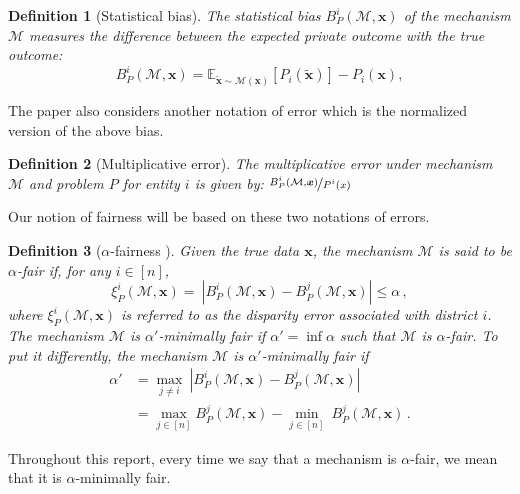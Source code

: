 \documentclass[9pt,lineno,twocolumn,twoside]{pnas-new}
\newtheorem{definition}{Definition}
\newcommand{\cM}{\mathcal{M}}
\newcommand{\EE}{\mathbb{E}} \newcommand{\RR}{\mathbb{R}}
\newcommand{\truedata}{\bm{x}}
\begin{document}
    \begin{definition}[Statistical bias]
        \label{def:bias}
        The statistical bias  $ B_P^i(\cM, \bm{x}) $ of the mechanism $\cM$ measures the difference between the expected private outcome with the true outcome:
        \begin{equation}
            \label{eq:bias}
            B_P^i(\cM, \bm{x}) =
            \EE_{\tilde{\bm{x}} \sim \cM(\bm{x})} \left[ P_i(\tilde{\bm{x}}) \right] - P_i (\bm{x}),
        \end{equation}

    \end{definition}

    The paper also considers another notation of error which is the normalized version of the above bias.
    \begin{definition}[Multiplicative error]
        The multiplicative error under mechanism $\cM$ and problem $P$ for entity $i$ is given by: $\nicefrac{B_P^i(\cM, \bm{x})}{P^i(x)}$

    \end{definition}

    Our notion of fairness will be based on these two notations of errors.


    \begin{definition}[$\alpha$-fairness \cite{fioretto:CP-19,}]
        Given the true data $\truedata$, the mechanism $\cM$ is said to be \emph{$\alpha$-fair} if, for any $i\in[n]$,
        \begin{equation*}
            \xi^{i}_P(\cM, \bm{x}) = ~\left\vert  B_P^i(\cM, \bm{x}) - B_P^j(\cM, \bm{x})
            \right\vert\leq \alpha\,,
        \end{equation*}
        where $ \xi^{i}_P(\cM, \bm{x})$ is referred to as the \emph{disparity error} associated with
        district $i$. The mechanism $\cM$ is \emph{$\alpha'$-minimally fair} if $\alpha'=\inf \alpha$ such that
        $\cM$ is $\alpha$-fair. To put it differently, the mechanism $\cM$ is \emph{$\alpha'$-minimally fair} if
        \begin{align*}
            \alpha'& = \max_{j\neq i}~\left\vert  B_P^i(\cM, \bm{x}) - B_P^j(\cM, \bm{x})
            \right\vert \\
            &= \max_{j\in [n]} B_P^j(\cM, \bm{x})   -\min_{j\in [n]}~ B_P^j(\cM, \bm{x}) \,.
        \end{align*}
    \end{definition}
    Throughout this report, every time we say that a mechanism is $\alpha$-fair, we mean that
    it is $\alpha$-minimally fair.
\end{document}
